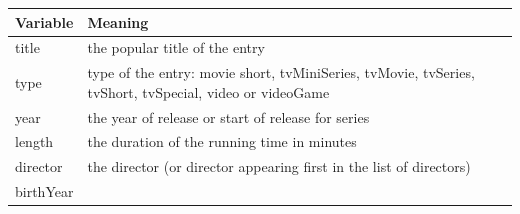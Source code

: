 \documentclass[]{book}
\begin{document}
\begin{longtable}[]{@{}ll@{}}
\toprule
\begin{minipage}[b]{0.12\columnwidth}\raggedright
Variable\strut
\end{minipage} & \begin{minipage}[b]{0.82\columnwidth}\raggedright
Meaning\strut
\end{minipage}\tabularnewline
\midrule
\endhead
\begin{minipage}[t]{0.12\columnwidth}\raggedright
title\strut
\end{minipage} & \begin{minipage}[t]{0.82\columnwidth}\raggedright
the popular title of the entry\strut
\end{minipage}\tabularnewline
\begin{minipage}[t]{0.12\columnwidth}\raggedright
type\strut
\end{minipage} & \begin{minipage}[t]{0.82\columnwidth}\raggedright
type of the entry: movie short, tvMiniSeries, tvMovie, tvSeries, tvShort, tvSpecial, video or videoGame\strut
\end{minipage}\tabularnewline
\begin{minipage}[t]{0.12\columnwidth}\raggedright
year\strut
\end{minipage} & \begin{minipage}[t]{0.82\columnwidth}\raggedright
the year of release or start of release for series\strut
\end{minipage}\tabularnewline
\begin{minipage}[t]{0.12\columnwidth}\raggedright
length\strut
\end{minipage} & \begin{minipage}[t]{0.82\columnwidth}\raggedright
the duration of the running time in minutes\strut
\end{minipage}\tabularnewline
\begin{minipage}[t]{0.12\columnwidth}\raggedright
director\strut
\end{minipage} & \begin{minipage}[t]{0.82\columnwidth}\raggedright
the director (or director appearing first in the list of directors)\strut
\end{minipage}\tabularnewline
\begin{minipage}[t]{0.12\columnwidth}\raggedright
birthYear\strut
\end{minipage} & \begin{minipage}[t]{0.82\columnwidth}\raggedright

\end{minipage}
\end{longtable}
\end{document}
